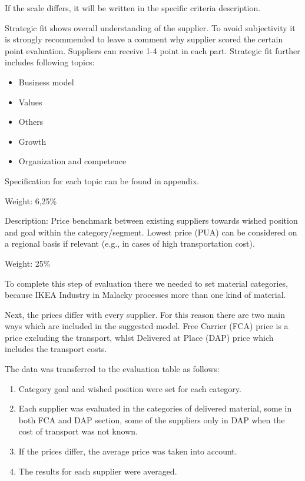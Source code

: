 \documentclass[oneside,12pt]{article}%
\begin{document}
If the scale differs, it will be written in the specific criteria description.

Strategic fit shows overall understanding of the supplier. To avoid subjectivity it is strongly recommended to leave a comment why supplier scored the certain point evaluation. Suppliers can receive 1-4 point in each part. Strategic fit further includes following topics:
\begin{itemize}
  \item Business model
  \item Values
  \item Others
  \item Growth
  \item Organization and competence
\end{itemize}

Specification for each topic can be found in appendix. \par
\vspace{2mm}
\noindent Weight: 6,25\%



Description: Price benchmark between existing suppliers towards wished position and goal within the category/segment. Lowest price (PUA) can be considered on a regional basis if relevant (e.g., in cases of high transportation cost).

\vspace{2mm}
\noindent Weight: 25\%
\vspace{2mm}

To complete this step of evaluation there we needed to set material categories, because IKEA Industry in Malacky processes more than one kind of material. \par
Next, the prices differ with every supplier. For this reason there are two main ways which are included in the suggested model. Free Carrier (FCA) price is a price excluding the transport, whlst Delivered at Place (DAP) price which includes the transport costs. \par
The data was transferred to the evaluation table as follows:

\begin{enumerate}
  \item Category goal and wished position were set for each category.
  \item Each supplier was evaluated in the categories of delivered material, some in both FCA and DAP section, some of the suppliers only in DAP when the cost of transport was not known.
  \item If the prices differ, the average price was taken into account.
  \item The results for each supplier were averaged.
\end{enumerate}
\end{document}
